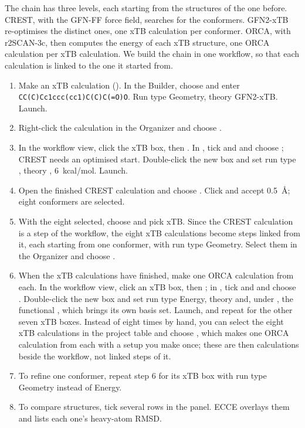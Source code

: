 The chain has three levels, each starting from the structures of the one before. CREST, with the GFN-FF force field, searches for the conformers. GFN2-xTB re-optimises the distinct ones, one xTB calculation per conformer. ORCA, with r2SCAN-3c, then computes the energy of each xTB structure, one ORCA calculation per xTB calculation. We build the chain in one workflow, so that each calculation is linked to the one it started from.
\begin{enumerate}
	\item Make an xTB calculation (). In the Builder, choose  and enter \texttt{CC(C)Cc1ccc(cc1)C(C)C(=O)O}. Run type Geometry, theory GFN2-xTB. Launch.
	\item Right-click the calculation in the Organizer and choose .
	\item In the workflow view, click the xTB box, then . In , tick  and  and choose ; CREST needs an optimised start. Double-click the new box and set run type , theory ,  6~kcal/mol. Launch.
	\item Open the finished CREST calculation and choose . Click  and accept \SI{0.5}{\angstrom}; eight conformers are selected.
	\item With the eight selected, choose  and pick xTB. Since the CREST calculation is a step of the workflow, the eight xTB calculations become steps linked from it, each starting from one conformer, with run type Geometry. Select them in the Organizer and choose .
	\item When the xTB calculations have finished, make one ORCA calculation from each. In the workflow view, click an xTB box, then ; in , tick  and  and choose . Double-click the new box and set run type Energy, theory  and, under , the functional , which brings its own basis set. Launch, and repeat for the other seven xTB boxes. Instead of eight times by hand, you can select the eight xTB calculations in the project table and choose , which makes one ORCA calculation from each with a setup you make once; these are then calculations beside the workflow, not linked steps of it.
	\item To refine one conformer, repeat step 6 for its xTB box with run type Geometry instead of Energy.
	\item To compare structures, tick several rows in the  panel. ECCE overlays them and lists each one's heavy-atom RMSD.
\end{enumerate}

